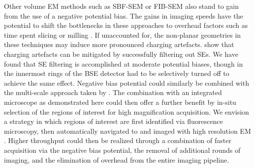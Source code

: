 Other volume EM methods such as SBF-SEM or FIB-SEM also stand to gain from the use of a negative potential bias. The gains in imaging speeds have the potential to shift the bottlenecks in these approaches to overhead factors such as time spent slicing or milling \cite{kornfeld2018progress}. If unaccounted for, the non-planar geometries in these techniques may induce more pronounced charging artefacts. \textcite{bouwer2016deceleration} show that charging artefacts can be mitigated by successfully filtering out SEs. We have found that SE filtering is accomplished at moderate potential biases, though in \textcite{bouwer2016deceleration} the innermost rings of the BSE detector had to be selectively turned off to achieve the same effect. Negative bias potential could similarly be combined with the multi-scale approach taken by \textcite{hildebrand2017whole}. The combination with an integrated microscope as demonstrated here could then offer a further benefit by in-situ selection of the regions of interest for high magnification acquisition. We envision a strategy in which regions of interest are first identified via fluorescence microscopy, then automatically navigated to and imaged with high resolution EM \cite{koning2019integrated}. Higher throughput could then be realized through a combination of faster acquisition via the negative bias potential, the removal of additional rounds of imaging, and the elimination of overhead from the entire imaging pipeline.

